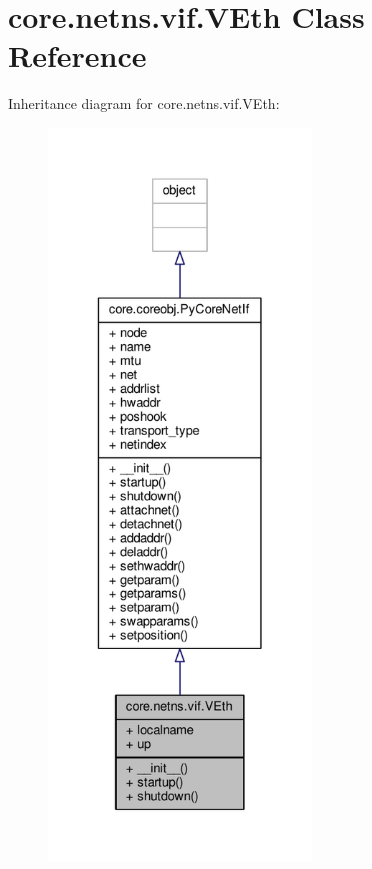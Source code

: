 \hypertarget{classcore_1_1netns_1_1vif_1_1_v_eth}{\section{core.\+netns.\+vif.\+V\+Eth Class Reference}
\label{classcore_1_1netns_1_1vif_1_1_v_eth}
}


Inheritance diagram for core.\+netns.\+vif.\+V\+Eth\+:
\nopagebreak
\begin{figure}[H]
\begin{center}
\leavevmode
\includegraphics[height=550pt]{classcore_1_1netns_1_1vif_1_1_v_eth__inherit__graph}
\end{center}
\end{figure}


